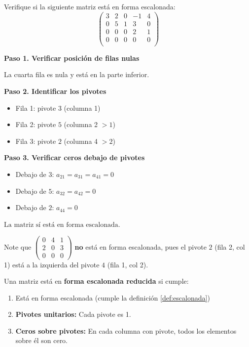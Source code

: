 \begin{example}
Verifique si la siguiente matriz está en forma escalonada:
\[
\begin{pmatrix}
\boxed{3} & 2 & 0 & -1 & 4 \\
0 & \boxed{5} & 1 & 3 & 0 \\
0 & 0 & 0 & \boxed{2} & 1 \\
0 & 0 & 0 & 0 & 0 \\
\end{pmatrix}
\]

\begin{myproof}
\textbf{Paso 1. Verificar posición de filas nulas}

La cuarta fila es nula y está en la parte inferior. \checkmark

\textbf{Paso 2. Identificar los pivotes}

\begin{itemize}
\item Fila 1: pivote $\boxed{3}$ (columna 1)
\item Fila 2: pivote $\boxed{5}$ (columna 2 $> 1$) \checkmark
\item Fila 3: pivote $\boxed{2}$ (columna 4 $> 2$) \checkmark
\end{itemize}

\textbf{Paso 3. Verificar ceros debajo de pivotes}

\begin{itemize}
\item Debajo de $\boxed{3}$: $a_{21}=a_{31}=a_{41}=0$ \checkmark
\item Debajo de $\boxed{5}$: $a_{32}=a_{42}=0$ \checkmark
\item Debajo de $\boxed{2}$: $a_{44}=0$ \checkmark
\end{itemize}

$\boxed{\text{La matriz sí está en forma escalonada.}}$

Note que $\begin{pmatrix}
0 & \boxed{4} & 1 \\
\boxed{2} & 0 & 3 \\
0 & 0 & 0
\end{pmatrix}$ \textbf{no} está en forma escalonada, pues el pivote $\boxed{2}$ (fila 2, col 1) está a la izquierda del pivote $\boxed{4}$ (fila 1, col 2).
\end{myproof}
\end{example}

\begin{definition}\label{def:escalonada-reducida}
Una matriz está en \textbf{forma escalonada reducida} si cumple:
\begin{enumerate}
\item Está en forma escalonada (cumple la definición \ref{def:escalonada})
\item \textbf{Pivotes unitarios:} Cada pivote es 1.
\item \textbf{Ceros sobre pivotes:} En cada columna con pivote, todos los elementos sobre él son cero.
\end{enumerate}
\end{definition}

